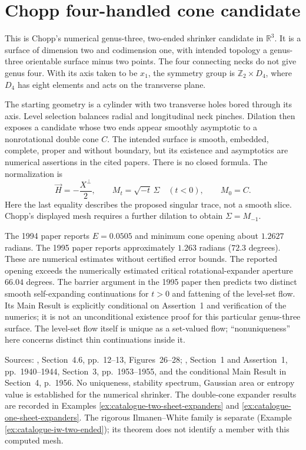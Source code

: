 \chapter{Chopp four-handled cone candidate}\label{sec:catalogue-chopp-four-handle}
\begin{example}\label{ex:catalogue-chopp-four-handle}
This is Chopp's numerical genus-three, two-ended shrinker candidate in
$\mathbb R^3$. It is a surface of dimension two and codimension one,
with intended topology a genus-three orientable surface minus two points.
The four connecting necks do not give genus four. With its axis taken to
be $x_1$, the symmetry group is $\mathbb Z_2\times D_4$, where $D_4$
has eight elements and acts on the transverse plane.

The starting geometry is a cylinder with two transverse holes bored
through its axis. Level selection balances radial and longitudinal neck
pinches. Dilation then exposes a candidate whose two ends appear smoothly
asymptotic to a nonrotational double cone $C$. The intended surface is
smooth, embedded, complete, proper and without boundary, but its
existence and asymptotics are numerical assertions in the cited papers.
There is no closed formula. The normalization is
\[
 \vec H=-\frac{X^\perp}{2},\qquad
 M_t=\sqrt{-t}\,\Sigma\quad(t<0),\qquad M_0=C.
\]
Here the last equality describes the proposed singular trace, not a
smooth slice. Chopp's displayed mesh requires a further dilation to obtain
$\Sigma=M_{-1}$.

The 1994 paper reports $E=0.0505$ and minimum cone opening about
$1.2627$ radians. The 1995 paper reports approximately $1.263$ radians
($72.3$ degrees). These are numerical estimates without certified error
bounds. The reported opening exceeds the numerically estimated critical
rotational-expander aperture $66.04$ degrees. The barrier argument in the
1995 paper then predicts two distinct smooth self-expanding continuations
for $t>0$ and fattening of the level-set flow. Its Main Result is explicitly
conditional on Assertion~1 and verification of the numerics; it is not
an unconditional existence proof for this particular genus-three surface.
The level-set flow itself is unique as a set-valued flow; ``nonuniqueness''
here concerns distinct thin continuations inside it.

Sources: \cite{CatChopp1994}, Section~4.6, pp.~12--13, Figures~26--28;
\cite{CatAIC95}, Section~1 and Assertion~1, pp.~1940--1944,
Section~3, pp.~1953--1955, and the conditional Main Result in Section~4,
p.~1956. No uniqueness, stability spectrum, Gaussian area or entropy value
is established for the numerical shrinker. The double-cone expander
results are recorded in Examples \ref{ex:catalogue-two-sheet-expanders}
and \ref{ex:catalogue-one-sheet-expanders}. The rigorous Ilmanen--White
family is separate (Example \ref{ex:catalogue-iw-two-ended}); its theorem
does not identify a member with this computed mesh.


\end{example}
